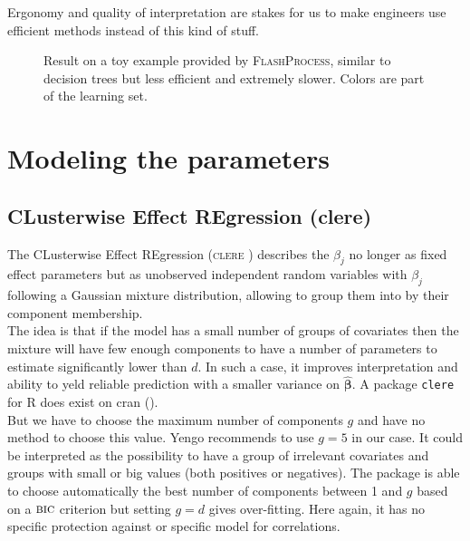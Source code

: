 \documentclass[12pt,a4paper]{report}
\begin{document}
			Ergonomy and quality of interpretation are stakes for us to make engineers use efficient methods instead of this kind of stuff.
	
		\begin{figure}[h!]
	\caption{Result on a toy example provided by \textsc{FlashProcess}, similar to decision trees but less efficient and extremely slower. Colors are part of the learning set.}\label{Regle2D}
\end{figure}	

	\section{Modeling the parameters}			%

		\subsection{CLusterwise Effect REgression ({\sc clere})}		%

			The CLusterwise Effect REgression (\textsc{clere} \cite{yengo2012variable}) describes the $\beta_j$ no longer as fixed effect parameters but as unobserved independent random variables with $\beta_j$ following a Gaussian mixture distribution, allowing to group them into by their component membership. \\
			
			 The idea is that if the model has a small number of groups of covariates then the mixture will have few enough components to have a number of parameters to estimate significantly lower than $d$. In such a case, it improves interpretation and ability to yeld reliable prediction with a smaller variance on $\boldsymbol{\hat{\beta}}$. A package {\tt clere} for R does exist on {\sc cran} (\cite{packageclere}).%
			 \\
			 
			 But we have to choose the maximum number of components $g$ and have no method to choose this value. Yengo recommends to use $g=5$ in our case. It could be interpreted as the possibility to have a group of irrelevant covariates and groups with small or big values (both positives or negatives). The package is able to choose automatically the best number of components between 1 and $g$ based on a $\mbox{{\sc bic}}$ criterion but setting $g=d$ gives over-fitting.
	 Here again, it has no specific protection against or specific model for correlations. 
\end{document}
